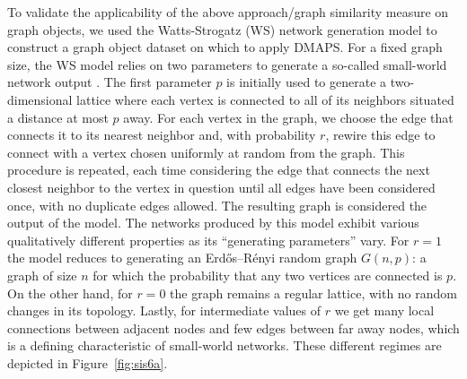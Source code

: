 To validate the applicability of the above approach/graph similarity
measure on graph objects, we used the Watts-Strogatz (WS) network
generation model to construct a graph object dataset on which to apply
DMAPS. For a fixed graph size, the WS model relies on two parameters
to generate a so-called small-world network output
\cite{watts_collective_1998}. The first parameter $p$ is initially
used to generate a two-dimensional lattice where each vertex is
connected to all of its neighbors situated a distance at most $p$
away. For each vertex in the graph, we choose the edge that connects
it to its nearest neighbor and, with probability $r$, rewire this edge
to connect with a vertex chosen uniformly at random from the
graph. This procedure is repeated, each time considering the edge that
connects the next closest neighbor to the vertex in question until all
edges have been considered once, with no duplicate edges allowed. The
resulting graph is considered the output of the model. The networks
produced by this model exhibit various qualitatively different
properties as its “generating parameters” vary. For $r=1$ the model
reduces to generating an Erdős–Rényi random graph $G(n,p)$: a graph of
size $n$ for which the probability that any two vertices are connected
is $p$. On the other hand, for $r=0$ the graph remains a regular
lattice, with no random changes in its topology. Lastly, for
intermediate values of $r$ we get many local connections between
adjacent nodes and few edges between far away nodes, which is a
defining characteristic of small-world networks. These different
regimes are depicted in Figure~\ref{fig:sis6a}.

